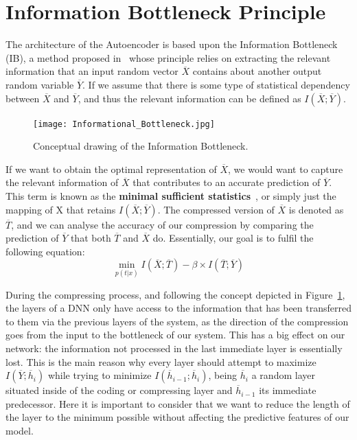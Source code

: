 \section{Information Bottleneck Principle}

The architecture of the Autoencoder is based upon the  Information Bottleneck (IB), a method proposed in~\cite{Inf_Bottleneck_first} whose principle relies on extracting the relevant information that an input random vector $\overline X$ contains about another output random variable $\overline Y$. If we assume that there is some type of statistical dependency between $\overline X$ and $\overline Y$, and thus the relevant information can be defined as $I(\overline X;\overline Y)$.\par
%
\begin{figure}[H]
	\centering
	\texttt{[image: Informational\_Bottleneck.jpg]}
	\caption{Conceptual drawing of the Information Bottleneck.}
	\label{fig:figure_info_bottle}
\end{figure} 

If we want to obtain the optimal representation of $\overline X$, we would want to capture the relevant information of $\overline X$ that contributes to an accurate prediction of $\overline Y$. This term is known as the \textbf{minimal sufficient statistics}~\cite{Minimal_and_Autoencoder}, or simply just the mapping of X that retains $I(\overline X;\overline Y)$. The compressed version of $\overline X$ is denoted as $\overline T$, and we can analyse the accuracy of our compression by comparing the prediction of $\overline Y$ that both $\overline T$ and $\overline X$ do. Essentially, our goal is to fulfil the following equation: %
%
\begin{equation}
\label{eq:Bottleneck_equation}
\min\limits_{p(t|x)}  I(\overline X;\overline T) - \beta \times I(\overline T;\overline Y)
\end{equation} \newline

During the compressing process, and following the concept depicted in Figure~\ref{fig:figure_info_bottle}, the layers of a DNN only have access to the information that has been transferred to them via the previous layers of the system, as the direction of the compression goes from the input to the bottleneck of our system. This has a big effect on our network: the information not processed in the last immediate layer is essentially lost. This is the main reason why every layer should attempt to maximize $I(\overline Y;\overline h_i)$ while trying to minimize $I(\overline h_{i-1}; \overline h_i)$, being $\overline h_i$ a random layer situated inside of the coding or compressing layer and $\overline h_{i-1}$ its immediate predecessor. Here it is important to consider that we want to reduce the length of the layer to the minimum possible without affecting the predictive features of our model. \par

